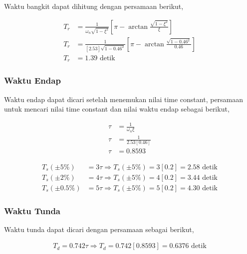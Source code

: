 \documentclass[../laporan]{subfiles}
\begin{document}
Waktu bangkit dapat dihitung dengan persamaan berikut,

\begin{equation}
    \begin{split}
        T_r &= \frac{1}{\omega_n\sqrt{1-\xi^2}}[\pi-\arctan\frac{\sqrt{1-\xi^2}}{\xi}] \\[5pt]
        T_r &= \frac{1}{[2.53]\sqrt{1-0.46^2}}[\pi-\arctan\frac{\sqrt{1-0.46^2}}{0.46}] \\[5pt]
        T_r &= 1.39 \text{ detik} 
    \end{split}
\end{equation}

\subsubsection{Waktu Endap}

Waktu endap dapat dicari setelah menemukan nilai time constant, persamaan untuk mencari nilai time constant dan nilai waktu endap sebagai berikut,

\begin{equation}
    \begin{split}
        \tau &= \frac{1}{\omega_n\xi} \\[5pt]
        \tau &= \frac{1}{2.53[0.46]} \\[5pt]
        \tau &= 0.8593
    \end{split}
\end{equation}

\begin{equation}
    \begin{split}
        T_s(\pm5\%) &= 3\tau \Rightarrow T_s(\pm5\%) = 3[0.2] = 2.58 \text{ detik} \\[5pt]
        T_s(\pm2\%) &= 4\tau \Rightarrow T_s(\pm5\%) = 4[0.2] = 3.44 \text{ detik}\\[5pt]
        T_s(\pm0.5\%) &= 5\tau \Rightarrow T_s(\pm5\%) = 5[0.2] = 4.30 \text{ detik}
    \end{split}
\end{equation}

\subsubsection{Waktu Tunda}

Waktu tunda dapat dicari dengan persamaan sebagai berikut,

\begin{equation}
    \begin{split}
        T_d = 0.742\tau \Rightarrow T_d = 0.742[0.8593] = 0.6376 \text{ detik}
    \end{split}
\end{equation}
\end{document}
